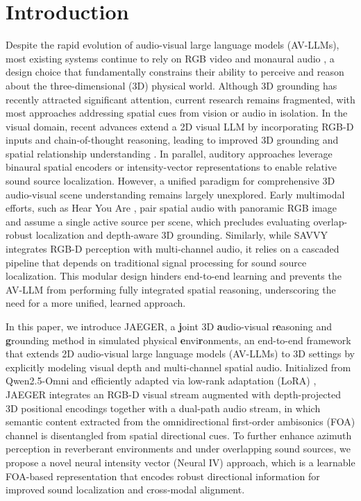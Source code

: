 \section{Introduction}

Despite the rapid evolution of audio-visual large language models (AV-LLMs), most existing systems continue to rely on RGB video and monaural audio \cite{xu2025qwen2, Qwen3-Omni, tang2025video, cheng2024videollama}, a design choice that fundamentally constrains their ability to perceive and reason about the three-dimensional (3D) physical world. Although 3D grounding has recently attracted significant attention, current research remains fragmented, with most approaches addressing spatial cues from vision or audio in isolation.
In the visual domain, recent advances extend a 2D visual LLM by incorporating RGB-D inputs and chain-of-thought reasoning, leading to improved 3D grounding and spatial relationship understanding \cite{wang2025n3d}. In parallel, auditory approaches leverage binaural spatial encoders \citep{zheng2024bat} or intensity-vector representations \citep{tang2024can} to enable relative sound source localization. However, a unified paradigm for comprehensive 3D audio-visual scene understanding remains largely unexplored.
Early multimodal efforts, such as Hear You Are \citep{ryu2025hear}, 
pair spatial audio with panoramic RGB image and assume a single active source per scene, which precludes evaluating overlap-robust localization and depth-aware 3D grounding. 
Similarly, while SAVVY \citep{chen2025savvy} integrates RGB-D perception with multi-channel audio, it relies on a cascaded pipeline that depends on traditional signal processing for sound source localization. 
This modular design hinders end-to-end learning and prevents the AV-LLM from performing fully integrated spatial reasoning, underscoring the need for a more unified, learned approach.

In this paper, we introduce JAEGER, a \textbf{j}oint 3D \textbf{a}udio-visual r\textbf{e}asoning and \textbf{g}rounding method in simulated physical \textbf{e}nvi\textbf{r}onments, an end-to-end framework that extends 2D audio-visual large language models (AV-LLMs) to 3D settings by explicitly modeling visual depth and multi-channel spatial audio. Initialized from Qwen2.5-Omni \citep{xu2025qwen2} and efficiently adapted via low-rank adaptation (LoRA) \cite{hu2022lora}, JAEGER integrates an RGB-D visual stream augmented with depth-projected 3D positional encodings together with a dual-path audio stream, in which semantic content extracted from the omnidirectional first-order ambisonics (FOA) channel is disentangled from spatial directional cues.
To further enhance azimuth perception in reverberant environments and under overlapping sound sources, we propose a novel neural intensity vector (Neural IV) approach, which is a learnable FOA-based representation that encodes robust directional information for improved sound localization and cross-modal alignment.

